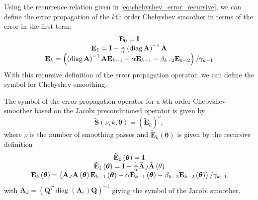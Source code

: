 \documentclass[review]{siamart190516}
\DeclareMathOperator{\diag}{diag}
\begin{document}
Using the recurrence relation given in \cref{eq:chebyshev_error_recursive}, we can define the error propagation of the $k$th order Chebyshev smoother in terms of the error in the first term:
\begin{equation}
\begin{tabular}{c}
$\mathbf{E}_0 = \mathbf{I}$\\
$\mathbf{E}_1 = \mathbf{I} - \frac{1}{\alpha} \left( \diag {\mathbf{A}} \right)^{-1} {\mathbf{A}}$\\
$\mathbf{E}_k = \left(\left( \diag {\mathbf{A}} \right)^{-1} {\mathbf{A}} \mathbf{E}_{k - 1} - \alpha \mathbf{E}_{k - 1} - \beta_{k - 2} \mathbf{E}_{k - 2} \right) / \gamma_{k - 1}$
\end{tabular}
\label{eq:chebyshev_error_propagation}
\end{equation}
With this recursive definition of the error propagation operator, we can define the symbol for Chebyshev smoothing.

\begin{definition}\label{def:chebyshev_symbol}
The symbol of the error propagation operator for a $k$th order Chebyshev smoother based on the Jacobi preconditioned operator is given by
\begin{equation}
\tilde{\mathbf{S}} \left( \nu, k, \boldsymbol{\theta} \right) = \left( \tilde{\mathbf{E}}_k \right)^\nu,
\end{equation}
where $\nu$ is the number of smoothing passes and $\tilde{\mathbf{E}}_k \left( \mathbf{\boldsymbol{\theta}} \right)$ is given by the recursive definition
\begin{equation}
\begin{tabular}{c}
$\tilde{\mathbf{E}}_0 \left( \boldsymbol{\theta} \right) = \mathbf{I}$\\
$\tilde{\mathbf{E}}_1 \left( \boldsymbol{\theta} \right) = \mathbf{I} - \frac{1}{\alpha} \tilde{\mathbf{A}}_J \tilde{\mathbf{A}} \left( \mathbf{\theta} \right)$\\
$\tilde{\mathbf{E}}_k \left( \boldsymbol{\theta} \right) = \left( \tilde{\mathbf{A}}_J \tilde{\mathbf{A}} \left( \boldsymbol{\theta} \right) \tilde{\mathbf{E}}_{k - 1} \left( \boldsymbol{\theta} \right) - \alpha \tilde{\mathbf{E}}_{k - 1} \left( \boldsymbol{\theta} \right) - \beta_{k - 2} \tilde{\mathbf{E}}_{k - 2} \left( \boldsymbol{\theta} \right) \right) / \gamma_{k - 1}$
\end{tabular}
\end{equation}
with $\tilde{\mathbf{A}}_J = \left( \mathbf{Q}^T \diag \left( \mathbf{A}_e \right) \mathbf{Q} \right)^{-1}$ giving the symbol of the Jacobi smoother.
\end{definition}
\end{document}
